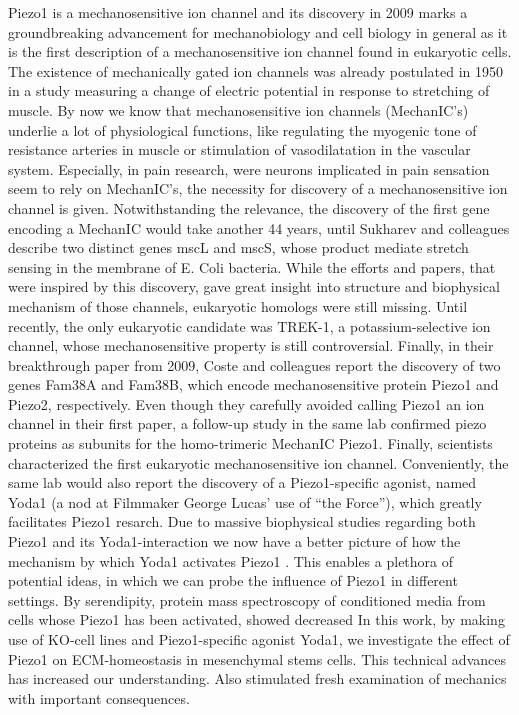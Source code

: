 Piezo1 is a mechanosensitive ion channel and its discovery in 2009 marks a groundbreaking advancement for mechanobiology and cell biology in general as it is the first description of a mechanosensitive ion channel found in eukaryotic cells. The existence of mechanically gated ion channels was already postulated in 1950 in a study measuring a change of electric potential in response to stretching of muscle. By now we know that mechanosensitive ion channels (MechanIC’s) underlie a lot of physiological functions, like regulating the myogenic tone of resistance arteries in muscle or stimulation of vasodilatation in the vascular system. Especially, in pain research, were neurons implicated in pain sensation seem to rely on MechanIC’s, the necessity for discovery of a mechanosensitive ion channel is given. Notwithstanding the relevance, the discovery of the first gene encoding a MechanIC would take another 44 years, until Sukharev and colleagues describe two distinct genes mscL and mscS, whose product mediate stretch sensing in the membrane of E. Coli bacteria. While the efforts and papers, that were inspired by this discovery, gave great insight into structure and biophysical mechanism of those channels, eukaryotic homologs were still missing. Until recently, the only eukaryotic candidate was TREK-1, a potassium-selective ion channel, whose mechanosensitive property is still controversial. Finally, in their breakthrough paper from 2009, Coste and colleagues report the discovery of two genes Fam38A and Fam38B, which encode mechanosensitive protein Piezo1 and Piezo2, respectively. Even though they carefully avoided calling Piezo1 an ion channel in their first paper, a follow-up study in the same lab confirmed piezo proteins as subunits for the homo-trimeric MechanIC Piezo1. Finally, scientists characterized the first eukaryotic mechanosensitive ion channel. Conveniently, the same lab would also report the discovery of a Piezo1-specific agonist, named Yoda1 (a nod at Filmmaker George Lucas’ use of “the Force”), which greatly facilitates Piezo1 resarch. \cite{Syeda2015} Due to massive biophysical studies regarding both Piezo1 \cite{Saotome2018} and its Yoda1-interaction \cite{Lacroix2018} we now have a better picture of how the mechanism by which Yoda1 activates Piezo1 \cite{Botello-Smith2019}. This enables a plethora of potential ideas, in which we can probe the influence of Piezo1 in different settings.
By serendipity, protein mass spectroscopy of conditioned media from cells whose Piezo1 has been activated, showed decreased In this work, by making use of KO-cell lines and Piezo1-specific agonist Yoda1, we investigate the effect of Piezo1 on ECM-homeostasis in mesenchymal stems cells.
This technical advances has increased our understanding. Also stimulated fresh examination of mechanics with important consequences.


